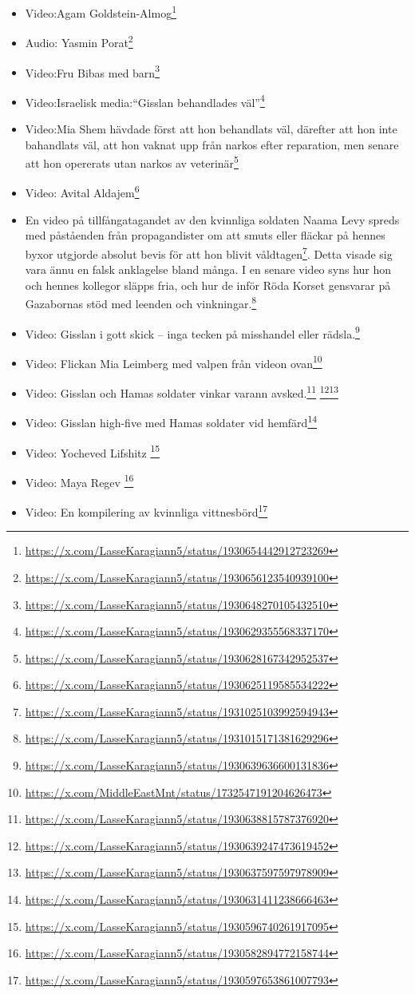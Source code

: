 \begin{itemize}
\item Video:Agam Goldstein-Almog\footnote{\url{https://x.com/LasseKaragiann5/status/1930654442912723269}}
\item Audio: Yasmin Porat\footnote{\url{https://x.com/LasseKaragiann5/status/1930656123540939100}}
\item Video:Fru Bibas med barn\footnote{\url{https://x.com/LasseKaragiann5/status/1930648270105432510}}
\item Video:Israelisk media:\enquote{Gisslan behandlades väl}\footnote{\url{https://x.com/LasseKaragiann5/status/1930629355568337170}}
\item Video:Mia Shem hävdade först att hon behandlats väl, därefter att hon inte bahandlats väl, att hon vaknat upp från narkos efter reparation, men senare att hon opererats utan narkos av veterinär\footnote{\url{https://x.com/LasseKaragiann5/status/1930628167342952537}}
\item Video: Avital Aldajem\footnote{\url{https://x.com/LasseKaragiann5/status/1930625119585534222}}
\item En video på tillfångatagandet av den kvinnliga soldaten Naama Levy spreds med påståenden från propagandister om att smuts eller fläckar på hennes byxor utgjorde absolut bevis för att hon blivit våldtagen\footnote{\url{https://x.com/LasseKaragiann5/status/1931025103992594943}}. Detta visade sig vara ännu en falsk anklagelse bland många. I en senare video syns hur hon och hennes kollegor släpps fria, och hur de inför Röda Korset gensvarar på Gazabornas stöd med leenden och vinkningar.\footnote{\url{https://x.com/LasseKaragiann5/status/1931015171381629296}}

\item Video: Gisslan i gott skick – inga tecken på misshandel eller rädsla.\footnote{\url{https://x.com/LasseKaragiann5/status/1930639636600131836}}
\item Video: Flickan Mia Leimberg med valpen från videon ovan\footnote{\url{https://x.com/MiddleEastMnt/status/1732547191204626473}}
\item Video: Gisslan och Hamas soldater vinkar varann avsked.\footnote{\url{https://x.com/LasseKaragiann5/status/1930638815787376920}} \footnote{\url{https://x.com/LasseKaragiann5/status/1930639247473619452}}\footnote{\url{https://x.com/LasseKaragiann5/status/1930637597597978909}}

\item Video: Gisslan high-five med Hamas soldater vid hemfärd\footnote{\url{https://x.com/LasseKaragiann5/status/1930631411238666463}}
\item Video: Yocheved Lifshitz \footnote{\url{https://x.com/LasseKaragiann5/status/1930596740261917095}}
\item Video: Maya Regev \footnote{\url{https://x.com/LasseKaragiann5/status/1930582894772158744}}
\item Video: En kompilering av kvinnliga vittnesbörd\footnote{\url{https://x.com/LasseKaragiann5/status/1930597653861007793}}
\end{itemize}


